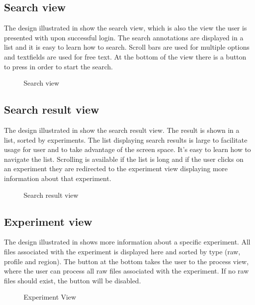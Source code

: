 \subsection{Search view}
The design illustrated in  show the search view, 
which is also the view the user is presented with upon successful login.
The search annotations are displayed in a list and it is easy to learn how to search.
Scroll bars are used for multiple options and textfields are used for free text. 
At the bottom of the view there is a button to press in order to start the search.

\begin{figure}[ht]
\caption{Search view}
\label{fig:and_search}
\end{figure}
\FloatBarrier

\subsection{Search result view}
The design illustrated in  show the search result view. 
The result is shown in a list, sorted by experiments. The list displaying search results is large to facilitate usage for user and to take advantage of the screen space. 
It's easy to learn how to navigate the list. 
Scrolling is available if the list is long and if the user clicks on an experiment they are redirected to the experiment view displaying more information about that experiment.

\begin{figure}[ht]
\caption{Search result view}
\label{fig:and_result}
\end{figure}
\FloatBarrier

\subsection{Experiment view}
The design illustrated in  shows more information about a specific experiment. 
All files associated with the experiment is displayed here and sorted by type (raw, profile and region).
The button  at the bottom takes the user to the process view, where the user can process all raw files associated with the experiment.
If no raw files should exist, the button will be disabled.

\begin{figure}[ht]
\caption{Experiment View}
\label{fig:and_experiment}
\end{figure}
\FloatBarrier

